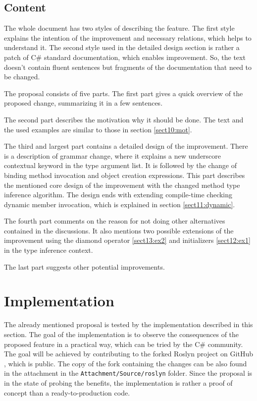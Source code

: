 \subsection{Content}

The whole document has two styles of describing the feature. 
The first style explains the intention of the improvement and necessary relations, which helps to understand it. 
The second style used in the detailed design section is rather a patch of C\# standard documentation, which enables improvement. 
So, the text doesn’t contain fluent sentences but fragments of the documentation that need to be changed.
\par
The proposal consists of five parts. 
The first part gives a quick overview of the proposed change, summarizing it in a few sentences.
\par
The second part describes the motivation why it should be done. The text
and the used examples are similar to those in section \ref{sect10:mot}.
\par
The third and largest part contains a detailed design of the improvement. 
There is a description of grammar change, where it explains a new underscore contextual keyword in the type argument list. 
It is followed by the change of binding method invocation and object creation expressions. 
This part describes the mentioned core design of the improvement with the changed method type inference algorithm. 
The design ends with extending compile-time checking dynamic member invocation, which is explained in section \ref{sect11:dynamic}.
\par
The fourth part comments on the reason for not doing other alternatives contained in the discussions. 
It also mentions two possible extensions of the improvement using the diamond operator \ref{sect13:ex2} and initializers \ref{sect12:ex1} in the type inference context.
\par
The last part suggests other potential improvements.

\section{Implementation}

The already mentioned proposal is tested by the implementation described in this section. 
The goal of the implementation is to observe the consequences of the proposed feature in a practical way, which can be tried by the C\# community. 
The goal will be achieved by contributing to the forked Roslyn project on GitHub \cite{online:roslynFork}, which is public.
The copy of the fork containing the changes can be also found in the attachment in the \texttt{Attachment/Source/roslyn} folder. 
Since the proposal is in the state of probing the benefits, the implementation is rather a proof of concept than a ready-to-production code.

